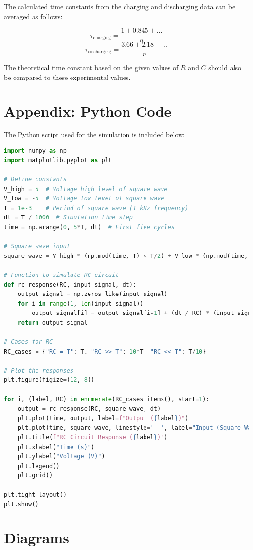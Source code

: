 \documentclass[a4paper,12pt]{article}
\begin{document}
The calculated time constants from the charging and discharging data can be averaged as follows:

\[
\tau_{\text{charging}} = \frac{1 + 0.845 + \dots}{n}
\]
\[
\tau_{\text{discharging}} = \frac{3.66 + 2.18 + \dots}{n}
\]

The theoretical time constant based on the given values of \( R \) and \( C \) should also be compared to these experimental values.
\section*{\color{myblue}Appendix: Python Code}
The Python script used for the simulation is included below:
\begin{lstlisting}[language=Python, caption=Python Code for RC Circuit Simulation, basicstyle=\ttfamily\footnotesize, keywordstyle=\color{blue}]
import numpy as np
import matplotlib.pyplot as plt

# Define constants
V_high = 5  # Voltage high level of square wave
V_low = -5  # Voltage low level of square wave
T = 1e-3    # Period of square wave (1 kHz frequency)
dt = T / 1000  # Simulation time step
time = np.arange(0, 5*T, dt)  # First five cycles

# Square wave input
square_wave = V_high * (np.mod(time, T) < T/2) + V_low * (np.mod(time, T) >= T/2)

# Function to simulate RC circuit
def rc_response(RC, input_signal, dt):
    output_signal = np.zeros_like(input_signal)
    for i in range(1, len(input_signal)):
        output_signal[i] = output_signal[i-1] + (dt / RC) * (input_signal[i-1] - output_signal[i-1])
    return output_signal

# Cases for RC
RC_cases = {"RC = T": T, "RC >> T": 10*T, "RC << T": T/10}

# Plot the responses
plt.figure(figize=(12, 8))

for i, (label, RC) in enumerate(RC_cases.items(), start=1):
    output = rc_response(RC, square_wave, dt)
    plt.plot(time, output, label=f"Output ({label})")
    plt.plot(time, square_wave, linestyle='--', label="Input (Square Wave)")
    plt.title(f"RC Circuit Response ({label})")
    plt.xlabel("Time (s)")
    plt.ylabel("Voltage (V)")
    plt.legend()
    plt.grid()

plt.tight_layout()
plt.show()
\end{lstlisting}

\section*{\color{myblue}Diagrams}
\end{document}
